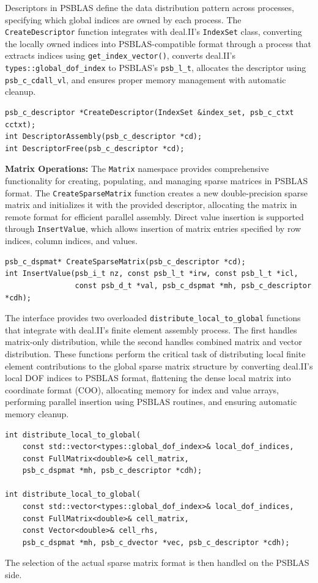 \documentclass[a4paper,12pt]{article}
\begin{document}
Descriptors in PSBLAS define the data distribution pattern across processes, specifying which global
indices are owned by each process. The \texttt{CreateDescriptor} function integrates
with deal.II's \texttt{IndexSet} class, converting the locally owned indices into PSBLAS-compatible
format through a process that extracts indices using \texttt{get\_index\_vector()}, converts
deal.II's \texttt{types::global\_dof\_index} to PSBLAS's \texttt{psb\_l\_t}, allocates the descriptor
using \texttt{psb\_c\_cdall\_vl}, and ensures proper memory management with automatic cleanup.
\begin{lstlisting}[caption=Descriptor management functions]
psb_c_descriptor *CreateDescriptor(IndexSet &index_set, psb_c_ctxt cctxt);
int DescriptorAssembly(psb_c_descriptor *cd);
int DescriptorFree(psb_c_descriptor *cd);
\end{lstlisting}

\textbf{Matrix Operations:} The \texttt{Matrix} namespace provides comprehensive functionality
for creating, populating, and managing sparse matrices in PSBLAS format. The \texttt{CreateSparseMatrix}
function creates a new double-precision sparse matrix and initializes it with the provided descriptor,
allocating the matrix in remote format for efficient parallel assembly. Direct value insertion is
supported through \texttt{InsertValue}, which allows insertion of matrix entries specified by
row indices, column indices, and values.
\begin{lstlisting}[caption=Matrix creation and value insertion]
psb_c_dspmat* CreateSparseMatrix(psb_c_descriptor *cd);
int InsertValue(psb_i_t nz, const psb_l_t *irw, const psb_l_t *icl, 
                const psb_d_t *val, psb_c_dspmat *mh, psb_c_descriptor *cdh);
\end{lstlisting}

The interface provides two overloaded \texttt{distribute\_local\_to\_global} functions that
integrate with deal.II's finite element assembly process. The first handles matrix-only
distribution, while the second handles combined matrix and vector distribution. These
functions perform the critical task of distributing local finite element contributions
to the global sparse matrix structure by converting deal.II's local DOF indices to PSBLAS format,
flattening the dense local matrix into coordinate format (COO), allocating memory for index
and value arrays, performing parallel insertion using PSBLAS routines, and ensuring
automatic memory cleanup.
\begin{lstlisting}[caption=Local-to-global distribution functions]
int distribute_local_to_global(
    const std::vector<types::global_dof_index>& local_dof_indices,
    const FullMatrix<double>& cell_matrix,
    psb_c_dspmat *mh, psb_c_descriptor *cdh);

int distribute_local_to_global(
    const std::vector<types::global_dof_index>& local_dof_indices,
    const FullMatrix<double>& cell_matrix,
    const Vector<double>& cell_rhs,
    psb_c_dspmat *mh, psb_c_dvector *vec, psb_c_descriptor *cdh);
\end{lstlisting}
The selection of the actual sparse matrix format is then handled on the PSBLAS side.
\end{document}
